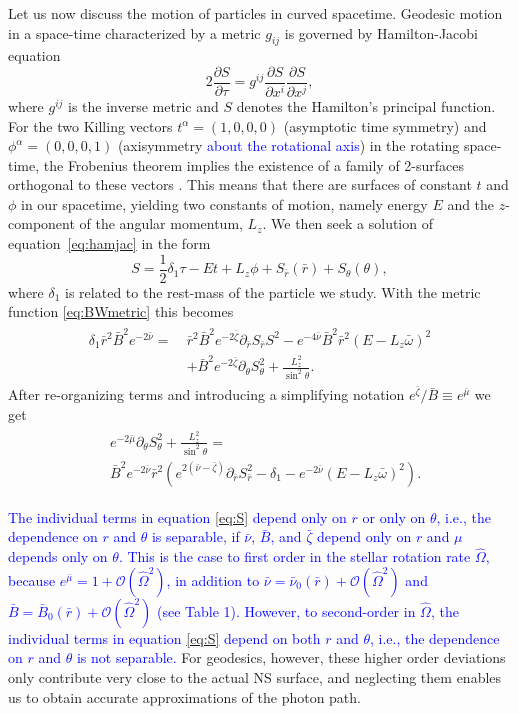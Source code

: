 \documentclass{aa}
\newcommand{\be}{\begin{equation}}
\newcommand{\ee}{\end{equation}}
\newcommand{\refe}[1]{\textcolor{blue}{{#1}}}
\newcommand{\pd}{\ensuremath{\partial}} %
\newcommand{\rb}{\ensuremath{\bar{r}}}
\newcommand{\wb}{\ensuremath{\bar{\omega}}}
\newcommand{\Ob}{\ensuremath{\hat{\Omega}}}
\newcommand{\nub}{\ensuremath{\bar{\nu}}}
\newcommand{\zetab}{\ensuremath{\bar{\zeta}}}
\newcommand{\Bb}{\ensuremath{\bar{B}}}
\newcommand{\mub}{\ensuremath{\bar{\mu}}}
\begin{document}
Let us now discuss the motion of particles in curved spacetime.
Geodesic motion in a space-time characterized by a metric $g_{ij}$ is governed by Hamilton-Jacobi equation
\be\label{eq:hamjac}
2\frac{\pd S}{\pd \tau} = g^{ij} \frac{\pd S}{\pd x^i}\frac{\pd S}{\pd x^j},
\ee
where $g^{ij}$ is the inverse metric and $S$ denotes the Hamilton's principal function.
For the two Killing vectors $t^{\alpha} = (1,0,0,0)$ (asymptotic time symmetry) and $\phi^{\alpha} = (0,0,0,1)$ (axisymmetry \refe{about the rotational axis}) in the rotating space-time, the Frobenius theorem implies the existence of a family of 2-surfaces orthogonal to these vectors \citep[see e.g.,][p.12]{rcs}.  
This means that there are surfaces of constant $t$ and $\phi$ in our spacetime, yielding two constants of motion, namely energy $E$ and the $z$-component of the angular momentum, $L_z$.  
We then seek a solution of equation~\eqref{eq:hamjac} in the form
\be
S = \frac{1}{2}\delta_1 \tau - Et + L_z\phi + S_{\rb}(\rb) + S_{\theta}(\theta),
\ee
where $\delta_1$ is related to the rest-mass of the particle we study.
With the metric function \eqref{eq:BWmetric} this becomes
\begin{align}\begin{split} 
    \delta_1 \rb^2 \Bb^2 e^{-2\nub} =~& \rb^2 \Bb^2 e^{-2\zetab} \pd_{\rb}S_{\rb}S^2 - e^{-4\nub} \Bb^2 \rb^2 (E - L_z \wb)^2 \\
                                & + \Bb^2 e^{-2\zetab} \pd_{\theta}S_{\theta}^2 + \frac{L_z^2}{\sin^2\theta}.
\end{split}\end{align}
After re-organizing terms and introducing a simplifying notation $e^{\zetab}/\Bb \equiv e^{\mub}$ we get
\begin{align}\begin{split}\label{eq:S}
& e^{-2\mub}\pd_{\theta}S_{\theta}^2 + \frac{L_z^2}{\sin^2\theta} = \\ 
& \Bb^2 e^{-2\nub}\rb^2 ( e^{2(\nub-\zetab)} \pd_{\rb}S_{\rb}^2 -\delta_{1} - e^{-2\nub}(E - L_z \wb)^2 ).
\end{split}\end{align}

\refe{The individual terms in equation \eqref{eq:S} depend only on $r$ or only on $\theta$, i.e., the dependence on $r$ and $\theta$ is separable, if $\nub$, $\Bb$, and $\zetab$ depend only on $r$ and $\mu$ depends only on $\theta$. 
This is the case to first order in the stellar rotation rate $\Ob$, because $e^{\mub} = 1 + \mathcal{O}(\Ob^2)$, in addition to $\nub = \nub_0(\rb) + \mathcal{O}(\Ob^2)$ and $\Bb = \Bb_0(\rb) + \mathcal{O}(\Ob^2)$ (see Table 1). 
However, to second-order in $\Ob$, the individual terms in equation \eqref{eq:S} depend on both $r$ and $\theta$, i.e., the dependence on $r$ and $\theta$ is not separable.}
For geodesics, however, these higher order deviations only contribute very close to the actual NS surface, and neglecting them enables us to obtain accurate approximations of the photon path.
\end{document}
